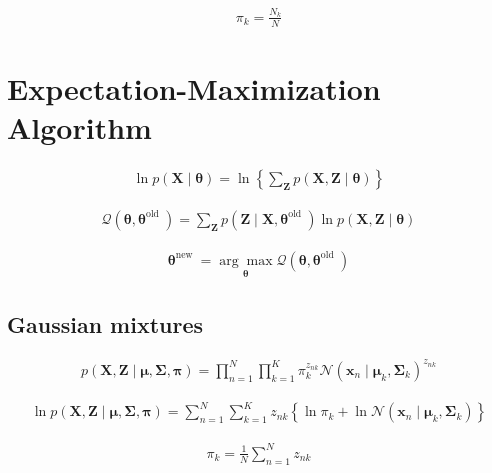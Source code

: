 \documentclass{article}
\begin{document}
\begin{align*}
\pi_{k}=\frac{N_{k}}{N}
\tag{15.21}
\end{align*}

\section{Expectation-Maximization Algorithm}

\begin{align*}
\ln p(\mathbf{X} \mid \boldsymbol{\theta})=\ln \left\{\sum_{\mathbf{Z}} p(\mathbf{X}, \mathbf{Z} \mid \boldsymbol{\theta})\right\} 
\tag{15.22}
\end{align*}

\begin{align*}
\mathcal{Q}\left(\boldsymbol{\theta}, \boldsymbol{\theta}^{\text{old }}\right)=\sum_{\mathbf{Z}} p\left(\mathbf{Z} \mid \mathbf{X}, \boldsymbol{\theta}^{\text{old }}\right) \ln p(\mathbf{X}, \mathbf{Z} \mid \boldsymbol{\theta}) 
\tag{15.23}
\end{align*}

\begin{align*}
\boldsymbol{\theta}^{\text{new }}=\underset{\boldsymbol{\theta}}{\arg \max } \mathcal{Q}\left(\boldsymbol{\theta}, \boldsymbol{\theta}^{\text{old }}\right) 
\tag{15.24}
\end{align*}

\subsection{Gaussian mixtures}

\begin{align*}
p(\mathbf{X}, \mathbf{Z} \mid \boldsymbol{\mu}, \boldsymbol{\Sigma}, \boldsymbol{\pi})=\prod_{n=1}^{N} \prod_{k=1}^{K} \pi_{k}^{z_{n k}} \mathcal{N}\left(\mathbf{x}_{n} \mid \boldsymbol{\mu}_{k}, \boldsymbol{\Sigma}_{k}\right)^{z_{n k}} 
\tag{15.25}
\end{align*}

\begin{align*}
\ln p(\mathbf{X}, \mathbf{Z} \mid \boldsymbol{\mu}, \boldsymbol{\Sigma}, \boldsymbol{\pi})=\sum_{n=1}^{N} \sum_{k=1}^{K} z_{n k}\left\{\ln \pi_{k}+\ln \mathcal{N}\left(\mathbf{x}_{n} \mid \boldsymbol{\mu}_{k}, \boldsymbol{\Sigma}_{k}\right)\right\} 
\tag{15.26}
\end{align*}

\begin{align*}
\pi_{k}=\frac{1}{N} \sum_{n=1}^{N} z_{n k} 
\tag{15.27}
\end{align*}
\end{document}
